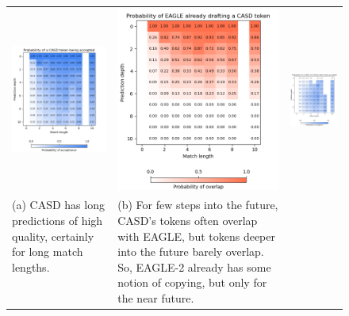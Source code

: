 \begin{landscape}

\begin{figure}
  \centering
  \captionsetup{width=0.52\linewidth}
  \begin{tabular}{@{}l@{}@{}l@{}@{}l@{}}
    \includegraphics[width=.33\linewidth]{fig/prob_casd_accept.png} & \includegraphics[width=.33\linewidth]{fig/prob_casd_eagle_overlap.png} & \includegraphics[width=.30\linewidth, height=.371\linewidth]{fig/prob_casd_non_eagle_accept.png} \\[0.5cm]
    \hspace{0.5cm} \parbox{.27\linewidth}{\small (a) CASD has long predictions of high quality, certainly for long match lengths. \newline \newline \newline} 
    & \hspace{0.5cm} \parbox{.27\linewidth}{\small (b) For few steps into the future, CASD's tokens often overlap with EAGLE, but tokens deeper into the future barely overlap. So, EAGLE-2 already has some notion of copying, but only for the near future.}

\end{tabular}
\end{figure}
\end{landscape}
